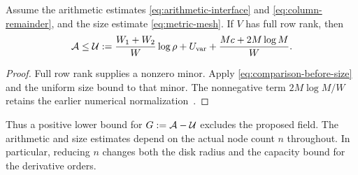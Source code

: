 \begin{proposition}\label{prop:comparison}
Assume the arithmetic estimates \eqref{eq:arithmetic-interface} and
\eqref{eq:column-remainder}, and the size estimate \eqref{eq:metric-mesh}.
If $V$ has full row rank, then
\begin{equation}\label{eq:master}
 \mathcal A\leq\mathcal U:=\frac{W_1+W_2}{W}\log\rho+U_{\rm var}
                       +\frac{Mc+2M\log M}{W}.
\end{equation}
\end{proposition}
\begin{proof}
Full row rank supplies a nonzero minor. Apply
\eqref{eq:comparison-before-size} and the uniform size bound to that minor.
The nonnegative term $2M\log M/W$ retains the earlier numerical
normalization~\cite{chung498}.
\end{proof}
Thus a positive lower bound for $G:=\mathcal A-\mathcal U$ excludes the proposed
field. The arithmetic and size estimates depend on the actual node count
$n$ throughout. In particular, reducing $n$ changes both the disk radius
and the capacity bound for the derivative orders.
